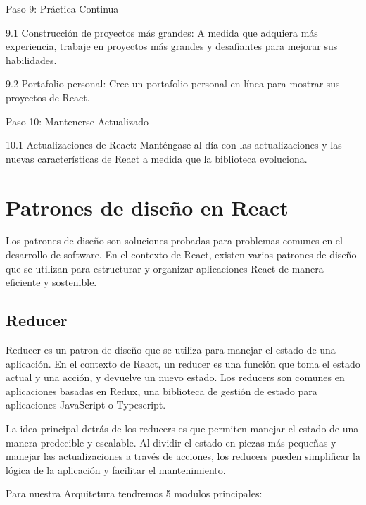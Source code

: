 \documentclass[executivepaper]{article}
\begin{document}
Paso 9: Práctica Continua

9.1 Construcción de proyectos más grandes: A medida que adquiera más experiencia, trabaje en proyectos más grandes y desafiantes para mejorar sus habilidades.

9.2 Portafolio personal: Cree un portafolio personal en línea para mostrar sus proyectos de React.

Paso 10: Mantenerse Actualizado

10.1 Actualizaciones de React: Manténgase al día con las actualizaciones y las nuevas características de React a medida que la biblioteca evoluciona.

\section{Patrones de diseño en React}

Los patrones de diseño son soluciones probadas para problemas comunes en el desarrollo de software. En el contexto de React, existen varios patrones de diseño que se utilizan para estructurar y organizar aplicaciones React de manera eficiente y sostenible.

\subsection{Reducer}

Reducer es un patron de diseño que se utiliza para manejar el estado de una aplicación. En el contexto de React, un reducer es una función que toma el estado actual y una acción, y devuelve un nuevo estado. Los reducers son comunes en aplicaciones basadas en Redux, una biblioteca de gestión de estado para aplicaciones JavaScript o Typescript.

La idea principal detrás de los reducers es que permiten manejar el estado de una manera predecible y escalable. Al dividir el estado en piezas más pequeñas y manejar las actualizaciones a través de acciones, los reducers pueden simplificar la lógica de la aplicación y facilitar el mantenimiento.

Para nuestra Arquitetura tendremos 5 modulos principales:
\end{document}
